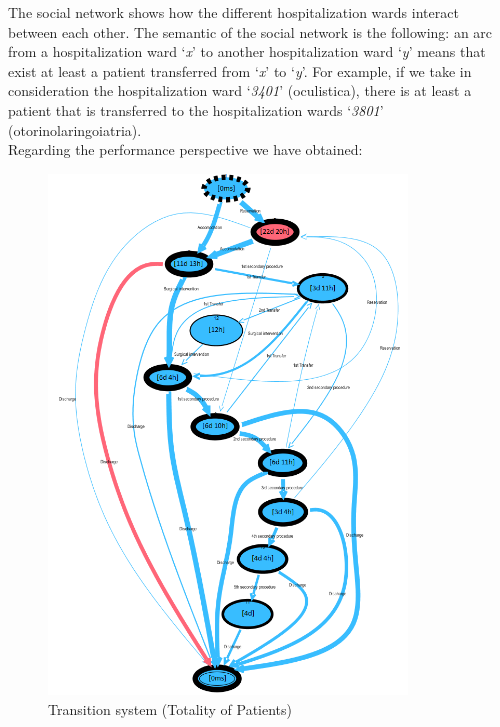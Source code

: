 The social network shows how the different hospitalization wards interact between each other. The semantic of the social network is the following: an arc from a hospitalization ward `\textit{x}' to another hospitalization ward `\textit{y}' means that exist at least a patient transferred from `\textit{x}' to `\textit{y}'. For example, if we take in consideration the hospitalization ward `\textit{3401}' (oculistica), there is at least a patient that is transferred to the hospitalization wards `\textit{3801}' (otorinolaringoiatria).\\
Regarding the performance perspective we have obtained:
\begin{figure} [htbp]
\includegraphics[width=0.85\textwidth , keepaspectratio]{RicoveriTransitionSystemSojourn}
\caption{Transition system (Totality of Patients)}
\end{figure}
\clearpage
\noindent
